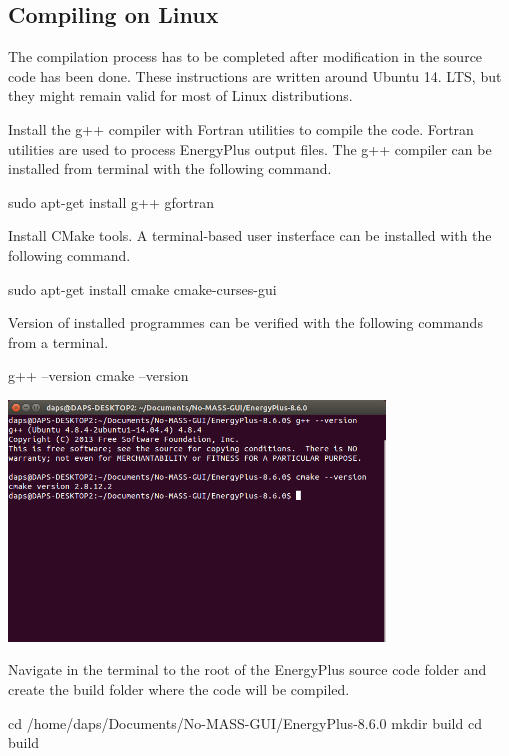  

\subsection*{Compiling on Linux}



The compilation process has to be completed after modification in the source code has been done. These instructions are written around Ubuntu 14. L\+TS, but they might remain valid for most of Linux distributions.


\begin{DoxyEnumerate}
\item Install the g++ compiler with Fortran utilities to compile the code. Fortran utilities are used to process Energy\+Plus output files. The g++ compiler can be installed from terminal with the following command. 
\begin{DoxyCode}
sudo apt-get install g++ gfortran
\end{DoxyCode}

\item Install C\+Make tools. A terminal-\/based user insterface can be installed with the following command. 
\begin{DoxyCode}
sudo apt-get install cmake cmake-curses-gui
\end{DoxyCode}
 Version of installed programmes can be verified with the following commands from a terminal. 
\begin{DoxyCode}
g++ --version
cmake --version
\end{DoxyCode}
  
\begin{DoxyImage}
\includegraphics[width=10cm]{gcompiler_cmake_version.png}
\end{DoxyImage}

\item Navigate in the terminal to the root of the Energy\+Plus source code folder and create the build folder where the code will be compiled. 
\begin{DoxyCode}
cd /home/daps/Documents/No-MASS-GUI/EnergyPlus-8.6.0
mkdir build
cd build
\end{DoxyCode}


\end{DoxyEnumerate}
